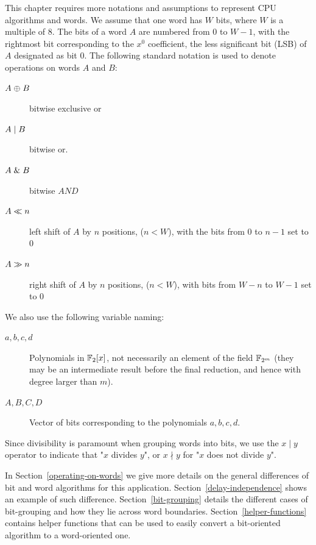 This chapter requires more notations and assumptions to represent CPU algorithms and words. We assume that one word has $W$ bits, where $W$ is a multiple of $8$. The bits of a word $A$ are numbered from $0$ to $W-1$, with the rightmost bit corresponding to the $x^0$ coefficient, the less significant bit (LSB) of $A$ designated as bit $0$. The following standard notation is used to denote operations on words $A$ and $B$:\\

\begin{description}
\item[$A \mathrel{\oplus} B$] bitwise exclusive or
\item[$A \mathrel{|} B$]  bitwise or.
\item[$A \mathrel{\&} B$]      bitwise $AND$
\item[$A \ll n$]      left shift of $A$ by $n$ positions, ($n<W$), with the bits from 0 to $n-1$ set to $0$
\item[$A\gg n$]     right shift of $A$ by $n$ positions, ($n<W$), with bits from $W-n$ to $W-1$ set to $0$
\end{description}

We also use the following variable naming:

\begin{description}
\item[$a, b, c, d$]  Polynomials in $\mathbb{F}_2[x]$, not necessarily an element of the field $\mathbb{F}_{2^m}$ (they may be an intermediate result before the final reduction, and hence with degree larger than $m$).
\item[$A, B, C, D$]  Vector of bits corresponding to the polynomials $a, b, c, d$.
\end{description}

Since divisibility is paramount when grouping words into bits, we use the $x \mid y$ operator to indicate that "$x$ divides $y$", or $x \nmid y$ for "$x$ does not divide $y$".

In Section~\ref{operating-on-words} we give more details on the general differences of bit and word algorithms for this application. Section~\ref{delay-independence} shows an example of such difference. Section~\ref{bit-grouping} details the different cases of bit-grouping and how they lie across word boundaries. Section~\ref{helper-functions} contains helper functions that can be used to easily convert a bit-oriented algorithm to a word-oriented one.


